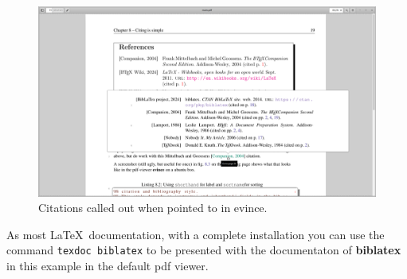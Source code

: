 \begin{figure}
   \centering \includegraphics[width=\linewidth]{images/activecitation.png}
  \caption{\label{fig:activecitation}Citations called out when pointed to in evince.}
\end{figure}

As most \LaTeX\ documentation, with a complete installation you can use the command \texttt{texdoc biblatex} to be presented with the
documentaton of \textbf{biblatex} in this example in the default pdf viewer.


